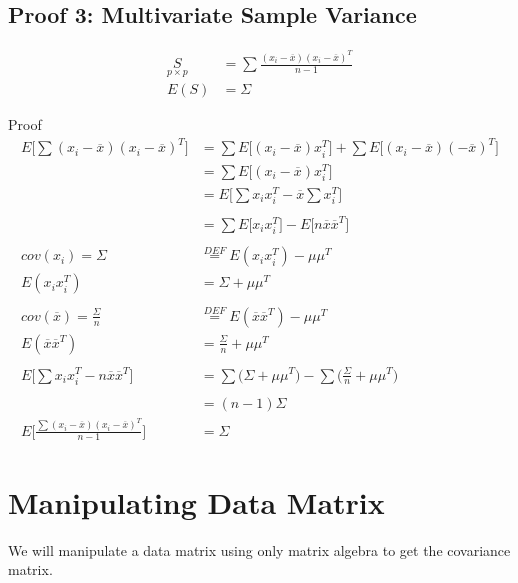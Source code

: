 \subsection{Proof 3: Multivariate Sample Variance}

\begin{align*}
    \underset{p \times p}{S} &= \sum \frac{(x_i - \overline{x})(x_i - \overline{x})^T}{n-1} \\
    E(S) &= \Sigma
\end{align*}

Proof
\begin{align*}
    E \big[\sum (x_i - \overline{x})(x_i - \overline{x})^T \big] &= \sum E \big [ (x_i-\overline{x}) x_i^T \big ] + \sum  E \big [ (x_i - \overline{x})(-\overline{x})^T \big ] \\
    &= \sum E \big [ (x_i-\overline{x}) x_i^T \big ]\\
    &=  E \big [\sum x_i x_i^T-\overline{x}\sum x_i^T  \big ]\\ \\
    &= \sum E \big [ x_i x_i^T \big ]- E \big [n\overline{x}\overline{x}^T \big ]\\ \\
    cov(x_i)= \Sigma &\overset{DEF}{=} E(x_ix_i^T) -\mu\mu^T\\
    E(x_ix_i^T) &= \Sigma +\mu\mu^T \\ \\
    cov(\overline{x})= \frac{\Sigma}{n} &\overset{DEF}{=} E(\overline{x} \overline{x}^T) -\mu\mu^T\\    E(\overline{x}\overline{x}^T) &= \frac{\Sigma}{n} +\mu\mu^T\\ \\
    E\Big[\sum x_i x_i^T-n\overline{x}\overline{x}^T \Big] &= \sum \Big(\Sigma +\mu\mu^T \Big) - \sum \Big( \frac{\Sigma}{n} +\mu\mu^T \Big)\\\\
    &= (n-1)\Sigma \\
    E\Big[ \frac{\sum (x_i - \overline{x})(x_i - \overline{x})^T}{n-1} \Big] &= \Sigma
\end{align*}

\section{Manipulating Data Matrix}

We will manipulate a data matrix using only matrix algebra to get the covariance matrix.

